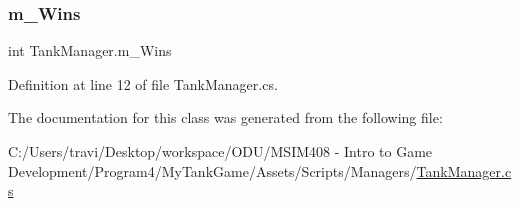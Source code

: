 \subsubsection{\texorpdfstring{m\+\_\+\+Wins}{m\_Wins}}
{\footnotesize\ttfamily int Tank\+Manager.\+m\+\_\+\+Wins}



Definition at line 12 of file Tank\+Manager.\+cs.



The documentation for this class was generated from the following file\+:\begin{DoxyCompactItemize}
\item 
C\+:/\+Users/travi/\+Desktop/workspace/\+O\+D\+U/\+M\+S\+I\+M408 -\/ Intro to Game Development/\+Program4/\+My\+Tank\+Game/\+Assets/\+Scripts/\+Managers/\hyperlink{_tank_manager_8cs}{Tank\+Manager.\+cs}\end{DoxyCompactItemize}

